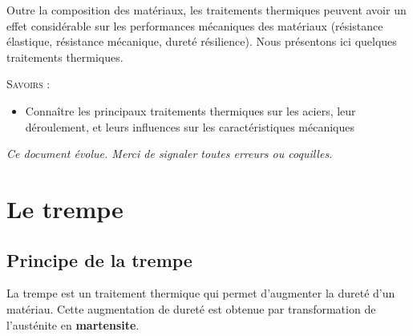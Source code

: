 \documentclass[11pt,oneside]{article}
\begin{document}
\vspace{.5cm}


Outre la composition des matériaux, les traitements thermiques peuvent avoir un effet considérable sur les performances mécaniques des matériaux (résistance élastique, résistance mécanique, dureté résilience). Nous présentons ici quelques traitements thermiques. 






\begin{savoir}
\textsc{Savoirs :}
\begin{itemize}
\item Connaître les principaux traitements thermiques sur les aciers, leur déroulement, et leurs influences sur les caractéristiques mécaniques
\end{itemize}
\end{savoir}


\setlength{\parskip}{0ex plus 0.2ex minus 0ex}
 \renewcommand{\contentsname}{}
 \renewcommand{\baselinestretch}{1}

\tableofcontents

 \renewcommand{\baselinestretch}{1.2}
\setlength{\parskip}{2ex plus 0.5ex minus 0.2ex}

\textit{Ce document évolue. Merci de signaler toutes erreurs ou coquilles.}


\section{Le trempe}
\subsection{Principe de la trempe}

\begin{obj}
La trempe est un traitement thermique qui permet d'augmenter la dureté d'un matériau. Cette augmentation de dureté est obtenue par transformation de l'austénite en \textbf{martensite}. 
\end{obj}
\end{document}
